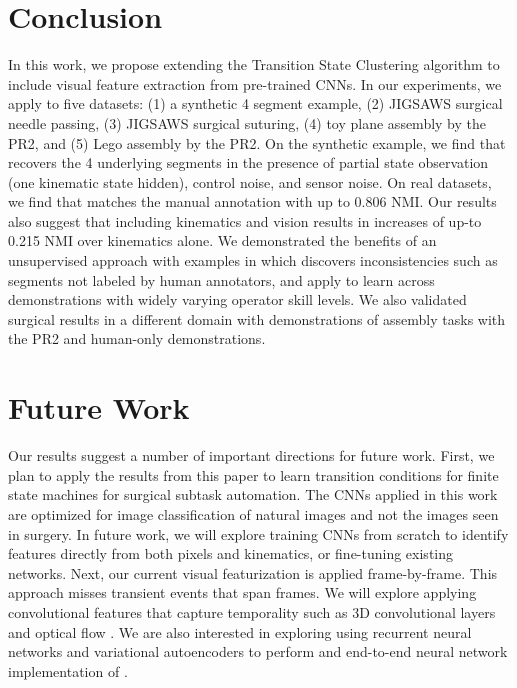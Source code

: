 \documentclass[0-main.tex]{subfiles}
\begin{document}
\section{Conclusion}
In this work, we propose \tsc extending the Transition State Clustering algorithm to include visual feature extraction from pre-trained CNNs.
In our experiments, we apply \tsc to five datasets: (1) a synthetic 4 segment example, (2) JIGSAWS surgical needle passing, (3) JIGSAWS surgical suturing, (4) toy plane assembly by the PR2, and (5) Lego assembly by the PR2.
On the synthetic example, we find that \tsc recovers the 4 underlying segments in the presence of partial state observation (one kinematic state hidden), control noise, and sensor noise.
On real datasets, we find that \tsc matches the manual annotation with up to 0.806 NMI.
Our results also suggest that including kinematics and vision results in increases of up-to 0.215 NMI over kinematics alone.
We demonstrated the benefits of an unsupervised approach with examples in which \tsc discovers inconsistencies such as segments not labeled by human annotators, and apply \tsc to learn across demonstrations with widely varying operator skill levels.
We also validated surgical results in a different domain with demonstrations of assembly tasks with the PR2 and human-only demonstrations.


\section{Future Work}
Our results suggest a number of important directions for future work.
First, we plan to apply the results from this paper to learn transition conditions for finite state machines for surgical subtask automation.
The CNNs applied in this work are optimized for image classification of natural images and not the images seen in surgery.
In future work, we will explore training CNNs from scratch to identify features directly from both pixels and kinematics, or fine-tuning existing networks. 
Next, our current visual featurization is applied frame-by-frame.
This approach misses transient events that span frames.
We will explore applying convolutional features that capture temporality such as 3D convolutional layers and optical flow \cite{simonyan2014two}.
We are also interested in exploring using recurrent neural networks and variational autoencoders to perform and end-to-end neural network implementation of \tsc.
\end{document}
